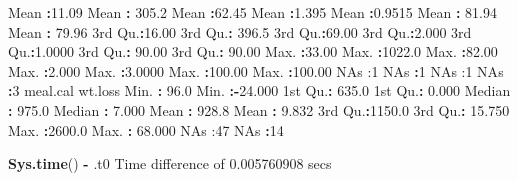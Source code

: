 \documentclass[
]{article}
\newenvironment{Shaded}{\begin{snugshade}}{\end{snugshade}}
\newcommand{\DecValTok}[1]{\textcolor[rgb]{0.00,0.00,0.81}{#1}}
\newcommand{\FloatTok}[1]{\textcolor[rgb]{0.00,0.00,0.81}{#1}}
\newcommand{\FunctionTok}[1]{\textcolor[rgb]{0.13,0.29,0.53}{\textbf{#1}}}
\newcommand{\NormalTok}[1]{#1}
\newcommand{\SpecialCharTok}[1]{\textcolor[rgb]{0.81,0.36,0.00}{\textbf{#1}}}
\newcommand{\StringTok}[1]{\textcolor[rgb]{0.31,0.60,0.02}{#1}}
\begin{document}
\begin{Shaded}
\begin{Highlighting}[]
\NormalTok{ Mean   }\SpecialCharTok{:}\FloatTok{11.09}\NormalTok{   Mean   }\SpecialCharTok{:} \FloatTok{305.2}\NormalTok{   Mean   }\SpecialCharTok{:}\FloatTok{62.45}\NormalTok{   Mean   }\SpecialCharTok{:}\FloatTok{1.395}\NormalTok{   Mean   }\SpecialCharTok{:}\FloatTok{0.9515}\NormalTok{   Mean   }\SpecialCharTok{:} \FloatTok{81.94}\NormalTok{   Mean   }\SpecialCharTok{:} \FloatTok{79.96}  
\NormalTok{ 3rd Qu.}\SpecialCharTok{:}\FloatTok{16.00}\NormalTok{   3rd Qu.}\SpecialCharTok{:} \FloatTok{396.5}\NormalTok{   3rd Qu.}\SpecialCharTok{:}\FloatTok{69.00}\NormalTok{   3rd Qu.}\SpecialCharTok{:}\FloatTok{2.000}\NormalTok{   3rd Qu.}\SpecialCharTok{:}\FloatTok{1.0000}\NormalTok{   3rd Qu.}\SpecialCharTok{:} \FloatTok{90.00}\NormalTok{   3rd Qu.}\SpecialCharTok{:} \FloatTok{90.00}  
\NormalTok{ Max.   }\SpecialCharTok{:}\FloatTok{33.00}\NormalTok{   Max.   }\SpecialCharTok{:}\FloatTok{1022.0}\NormalTok{   Max.   }\SpecialCharTok{:}\FloatTok{82.00}\NormalTok{   Max.   }\SpecialCharTok{:}\FloatTok{2.000}\NormalTok{   Max.   }\SpecialCharTok{:}\FloatTok{3.0000}\NormalTok{   Max.   }\SpecialCharTok{:}\FloatTok{100.00}\NormalTok{   Max.   }\SpecialCharTok{:}\FloatTok{100.00}  
\NormalTok{ NA}\StringTok{\textquotesingle{}s   :1                                                        NA\textquotesingle{}}\NormalTok{s   }\SpecialCharTok{:}\DecValTok{1}\NormalTok{        NA}\StringTok{\textquotesingle{}s   :1        NA\textquotesingle{}}\NormalTok{s   }\SpecialCharTok{:}\DecValTok{3}       
\NormalTok{    meal.cal         wt.loss       }
\NormalTok{ Min.   }\SpecialCharTok{:}  \FloatTok{96.0}\NormalTok{   Min.   }\SpecialCharTok{:{-}}\FloatTok{24.000}  
\NormalTok{ 1st Qu.}\SpecialCharTok{:} \FloatTok{635.0}\NormalTok{   1st Qu.}\SpecialCharTok{:}  \FloatTok{0.000}  
\NormalTok{ Median }\SpecialCharTok{:} \FloatTok{975.0}\NormalTok{   Median }\SpecialCharTok{:}  \FloatTok{7.000}  
\NormalTok{ Mean   }\SpecialCharTok{:} \FloatTok{928.8}\NormalTok{   Mean   }\SpecialCharTok{:}  \FloatTok{9.832}  
\NormalTok{ 3rd Qu.}\SpecialCharTok{:}\FloatTok{1150.0}\NormalTok{   3rd Qu.}\SpecialCharTok{:} \FloatTok{15.750}  
\NormalTok{ Max.   }\SpecialCharTok{:}\FloatTok{2600.0}\NormalTok{   Max.   }\SpecialCharTok{:} \FloatTok{68.000}  
\NormalTok{ NA}\StringTok{\textquotesingle{}s   :47       NA\textquotesingle{}}\NormalTok{s   }\SpecialCharTok{:}\DecValTok{14}       
\end{Highlighting}
\end{Shaded}

\begin{Shaded}
\begin{Highlighting}[]
\FunctionTok{Sys.time}\NormalTok{() }\SpecialCharTok{{-}}\NormalTok{ .t0}
\NormalTok{Time difference of }\FloatTok{0.005760908}\NormalTok{ secs}
\end{Highlighting}
\end{Shaded}
\end{document}

